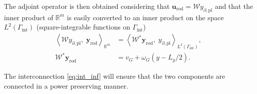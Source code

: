 \documentclass[letterpaper, 10 pt, conference]{ieeeconf}
\begin{document}
The adjoint operator is then obtained considering that $\bm{u}_{\text{rod}} = \mathcal{W} y_{\partial, \text{pl}}$ and that the inner product of $\mathbb{R}^m$ is easily converted to an inner product on the space $L^2(\Gamma_{\text{int}})$ (square-integrable functions on $\Gamma_{\text{int}}$)
\begin{align*}
\left\langle \mathcal{W} y_{\partial, \text{pl}}, \; \bm{y}_{\text{rod}} \right\rangle_{\mathbb{R}^m} &= \left\langle \mathcal{W}^* \bm{y}_{\text{rod}} , \; y_{\partial, \text{pl}} \right\rangle_{L^2(\Gamma_{\text{int}})}, \\
\mathcal{W}^* \bm{y}_{\text{rod}} &= v_G + \omega_{G} \left( y - L_y/2 \right).
\end{align*}

The interconnection \eqref{eq:int_inf} will ensure that the two components are connected in a power preserving manner.
\end{document}
